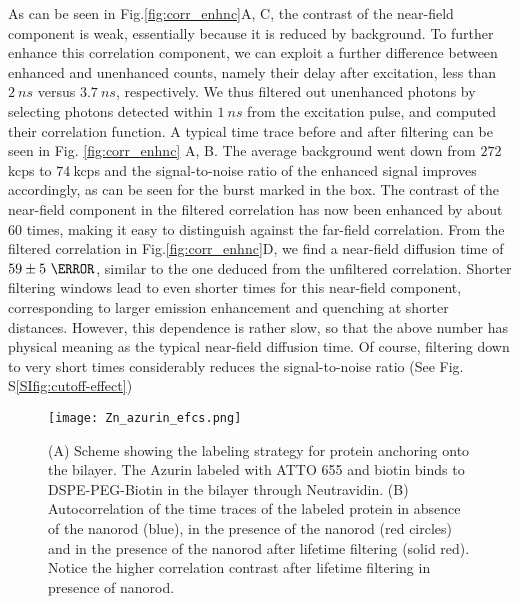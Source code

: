 As can be seen in Fig.\ref{fig:corr_enhnc}A, C, the contrast of the near-field component is weak, essentially because it is reduced by background. To further enhance this correlation component, we can exploit a further difference between enhanced and unenhanced counts, namely their delay after excitation, less than $2~ns$ versus $3.7~ns$, respectively. We thus filtered out unenhanced photons by selecting photons detected within $1~ns$ from the excitation pulse, and computed their correlation function. A typical time trace before and after filtering can be seen in Fig. \ref{fig:corr_enhnc} A, B. The average background went down from $272~$kcps to $74~$kcps and the signal-to-noise ratio of the enhanced signal improves accordingly, as can be seen for the burst marked in the box. The contrast of the near-field component in the filtered correlation has now been enhanced by about $60$ times, making it easy to distinguish against the far-field correlation. From the filtered correlation in Fig.\ref{fig:corr_enhnc}D, we find a near-field diffusion time of $59\pm5~\us$, similar to the one deduced from the unfiltered correlation. Shorter filtering windows lead to even shorter times for this near-field component, corresponding to larger emission enhancement and quenching at shorter distances. However, this dependence is rather slow, so that the above number has physical meaning as the typical near-field diffusion time. Of course, filtering down to very short times considerably reduces the signal-to-noise ratio (See Fig. S\ref{SIfig:cutoff-effect})\\
\begin{figure}
	\centering
	\texttt{[image: Zn\_azurin\_efcs.png]}
	\caption{(A) Scheme showing the labeling strategy for protein anchoring onto the bilayer. The Azurin labeled with ATTO 655 and biotin binds to DSPE-PEG-Biotin in the bilayer through Neutravidin. (B) Autocorrelation of the time traces of the labeled protein in absence of the nanorod (blue), in the presence of the nanorod (red circles) and in the presence of the nanorod after lifetime filtering (solid red). Notice the higher correlation contrast after lifetime filtering in presence of nanorod.}
	\label{fig:Zn_azurin_efcs}
\end{figure}

